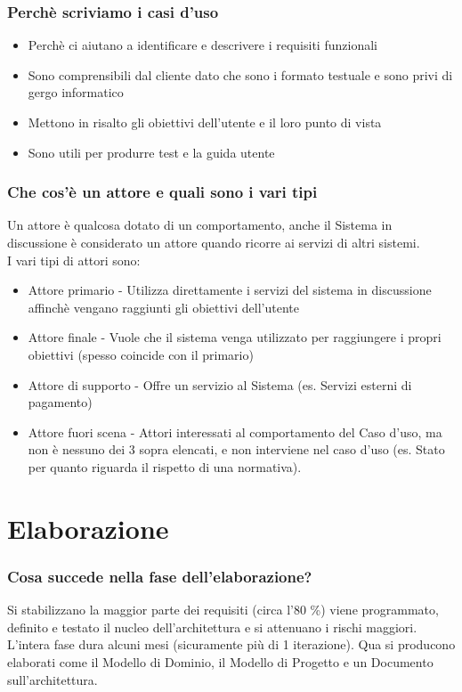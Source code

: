 \documentclass[12pt, a4paper, openany]{book}
\begin{document}
\subsection*{Perchè scriviamo i casi d'uso}
\begin{itemize}
    \item Perchè ci aiutano a identificare e descrivere i requisiti funzionali
    \item Sono comprensibili dal cliente dato che sono i formato testuale e sono privi di gergo informatico
    \item Mettono in risalto gli obiettivi dell'utente e il loro punto di vista
    \item Sono utili per produrre test e la guida utente
\end{itemize}

\subsection*{Che cos'è un attore e quali sono i vari tipi}
Un attore è qualcosa dotato di un comportamento, anche il Sistema in discussione è considerato un attore
quando ricorre ai servizi di altri sistemi.\\
I vari tipi di attori sono:
\begin{itemize}
    \item Attore primario - Utilizza direttamente i servizi del sistema in discussione affinchè
    vengano raggiunti gli obiettivi dell'utente
    \item Attore finale - Vuole che il sistema venga utilizzato per raggiungere i propri obiettivi 
    (spesso coincide con il primario)
    \item Attore di supporto - Offre un servizio al Sistema (es. Servizi esterni di pagamento)
    \item Attore fuori scena - Attori interessati al comportamento del Caso d'uso, ma non è nessuno dei 3 sopra elencati,
    e non interviene nel caso d'uso (es. Stato per quanto riguarda il rispetto di una normativa).
\end{itemize}

\chapter{Elaborazione}

\subsection*{Cosa succede nella fase dell'elaborazione?}
Si stabilizzano la maggior parte dei requisiti (circa l'80 \%) viene programmato, definito e testato il nucleo
dell'architettura e si attenuano i rischi maggiori. L'intera fase dura alcuni mesi (sicuramente più 
di 1 iterazione). Qua si producono elaborati come il Modello di Dominio, il Modello di Progetto e un Documento
sull'architettura.
\end{document}
